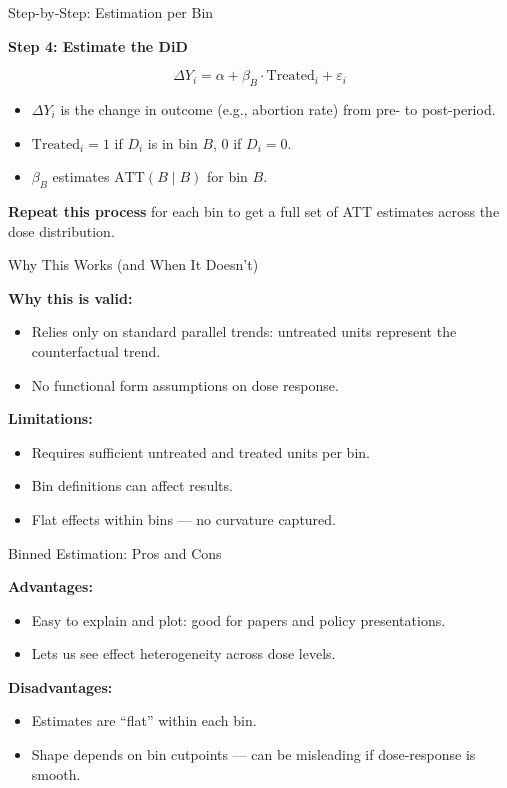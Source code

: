 \documentclass{beamer}
\begin{document}
\begin{frame}{Step-by-Step: Estimation per Bin}

\textbf{Step 4: Estimate the DiD}

\[
\Delta Y_i = \alpha + \beta_B \cdot \text{Treated}_i + \varepsilon_i
\]

\begin{itemize}
  \item $\Delta Y_i$ is the change in outcome (e.g., abortion rate) from pre- to post-period.
  \item $\text{Treated}_i = 1$ if $D_i$ is in bin $B$, 0 if $D_i = 0$.
  \item $\beta_B$ estimates $\text{ATT}(B \mid B)$ for bin $B$.
\end{itemize}

\bigskip

\textbf{Repeat this process} for each bin to get a full set of ATT estimates across the dose distribution.

\end{frame}




\begin{frame}{Why This Works (and When It Doesn’t)}

\textbf{Why this is valid:}
\begin{itemize}
  \item Relies only on standard parallel trends: untreated units represent the counterfactual trend.
  \item No functional form assumptions on dose response.
\end{itemize}

\bigskip

\textbf{Limitations:}
\begin{itemize}
  \item Requires sufficient untreated and treated units per bin.
  \item Bin definitions can affect results.
  \item Flat effects within bins — no curvature captured.
\end{itemize}

\end{frame}




\begin{frame}{Binned Estimation: Pros and Cons}

\textbf{Advantages:}
\begin{itemize}
  \item Easy to explain and plot: good for papers and policy presentations.
  \item Lets us see effect heterogeneity across dose levels.
\end{itemize}

\bigskip

\textbf{Disadvantages:}
\begin{itemize}
  \item Estimates are “flat” within each bin.
  \item Shape depends on bin cutpoints — can be misleading if dose-response is smooth.
\end{itemize}

\end{frame}
\end{document}
